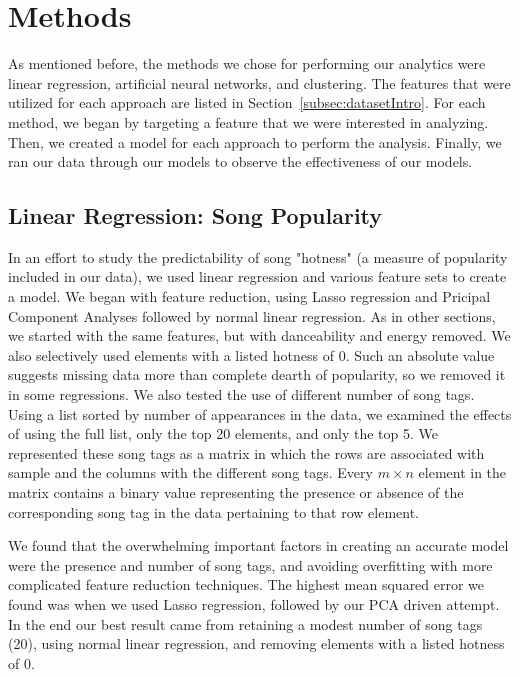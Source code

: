 \documentclass[12pt]{article}
\begin{document}
\section{Methods}
\label{sec:methods}
As mentioned before, the methods we chose for performing our analytics were linear regression, artificial neural networks, and clustering. The features that were utilized for each approach are listed in Section~\ref{subsec:datasetIntro}. For each method, we began by targeting a feature that we were interested in analyzing. Then, we created a model for each approach to perform the analysis. Finally, we ran our data through our models to observe the effectiveness of our models. 

\subsection{Linear Regression: Song Popularity}
\label{subsec:linearRegression}
In an effort to study the predictability of song "hotness" (a measure of popularity included in our data), we used linear regression and various feature sets to create a model. We began with feature reduction, using Lasso regression and Pricipal Component Analyses followed by normal linear regression. As in other sections, we started with the same features, but with danceability and energy removed. We also selectively used elements with a listed hotness of 0. Such an absolute value suggests missing data more than complete dearth of popularity, so we removed it in some regressions. We also tested the use of different number of song tags. Using a list sorted by number of appearances in the data, we examined the effects of using the full list, only the top 20 elements, and only the top 5. We represented these song tags as a matrix in which the rows are associated with sample and the columns with the different song tags. Every $m \times n$ element in the matrix contains a binary value representing the presence or absence of the corresponding song tag in the data pertaining to that row element.

We found that the overwhelming important factors in creating an accurate model were the presence and number of song tags, and avoiding overfitting with more complicated feature reduction techniques. The highest mean squared error we found was when we used Lasso regression, followed by our PCA driven attempt. In the end our best result came from retaining a modest number of song tags (20), using normal linear regression, and removing elements with a listed hotness of 0.
\end{document}
